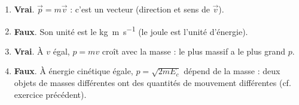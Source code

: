 \documentclass[11pt,a4paper]{article}
\newcommand{\vv}[1]{\vec{#1}}\newcommand{\ds}{\displaystyle}
\begin{document}
\begin{corrige}
\begin{enumerate}[label=\alph*)]
  \item \textbf{Vrai}. $\vv p=m\vv v$ : c'est un vecteur (direction et sens de $\vv v$).
  \item \textbf{Faux}. Son unité est le \si{\kilogram\metre\per\second} (le joule est l'unité d'énergie).
  \item \textbf{Vrai}. À $v$ égal, $p=mv$ croît avec la masse : le plus massif a le plus grand $p$.
  \item \textbf{Faux}. À énergie cinétique égale, $p=\sqrt{2mE_c}$ dépend de la masse : deux objets de
        masses différentes ont des quantités de mouvement différentes (cf. exercice précédent).
\end{enumerate}
\end{corrige}
\end{document}
